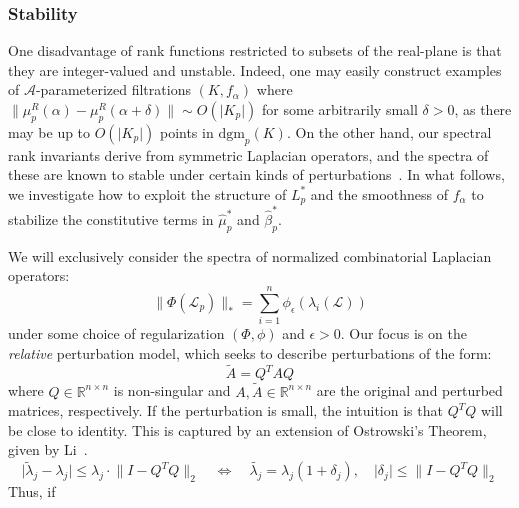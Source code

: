 \documentclass[10pt]{article}
\numberwithin{equation}{section}
\newcommand{\+}{%
	\raisebox{0.18ex}{\scaleobj{0.55}{+}}
}
\theoremstyle{definition}
\theoremstyle{definition}
\begin{document}
\subsubsection*{Stability}
One disadvantage of rank functions restricted to subsets of the real-plane is that they are integer-valued and unstable. Indeed, one may easily construct examples of $\mathcal{A}$-parameterized filtrations 
$(K, f_\alpha)$ where $\lVert \mu_p^R(\alpha) - \mu_{p}^R(\alpha + \delta) \rVert \sim O(\lvert K_p \rvert )$ for some arbitrarily small $\delta > 0$, as there may be up to $O( \lvert K_p \rvert)$ points in $\mathrm{dgm}_p(K)$.
On the other hand, our spectral rank invariants derive from symmetric Laplacian operators, and the spectra of these are known to stable under certain kinds of perturbations~\cite{bhatia2013matrix}. 
In what follows, we investigate how to exploit the structure of $L_p^\ast$ and the smoothness of $f_\alpha$ to stabilize the constitutive terms in $\hat{\mu}_p^\ast$ and $\hat{\beta}_p^{\ast}$. 

We will exclusively consider the spectra of normalized combinatorial Laplacian operators:
$$ \lVert \Phi( \mathcal{L}_p ) \rVert_\ast = \sum\limits_{i = 1}^n \phi_{\epsilon}(\lambda_i(\mathcal{L}))
$$
under some choice of regularization $(\Phi, \phi)$ and $\epsilon > 0$. Our focus is on the \emph{relative} perturbation model, which seeks to describe perturbations of the form: 
$$ \tilde{A} = Q^T A Q $$
where $Q \in \mathbb{R}^{n \times n}$ is non-singular and $A, \tilde{A} \in \mathbb{R}^{n \times n}$ are the original and perturbed matrices, respectively. If the perturbation is small, the intuition is that $Q^T Q$ will be close to identity. This is captured by an extension of Ostrowski's Theorem, given by Li~\cite{}. 
 $$ \lvert \tilde{\lambda}_j - \lambda_j \rvert \leq \lambda_j  \cdot  \lVert I - Q^T Q\rVert_2 \quad \Leftrightarrow \quad\tilde{\lambda_j} = \lambda_j(1 + \delta_j), \quad \lvert \delta_j \rvert \leq \lVert I - Q^T Q\rVert_2 $$
 Thus, if 
 
 
\end{document}
